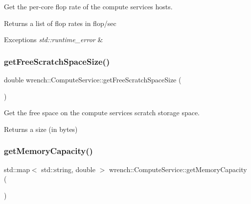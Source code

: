 Get the per-\/core flop rate of the compute service\textquotesingle{}s hosts. 

\begin{DoxyReturn}{Returns}
a list of flop rates in flop/sec
\end{DoxyReturn}

\begin{DoxyExceptions}{Exceptions}
{\em std\+::runtime\+\_\+error} & \\
\hline
\end{DoxyExceptions}
\mbox{\label{classwrench_1_1_compute_service_ac3662628f589ffe44e17921e60971fd6}} 
\subsubsection{\texorpdfstring{get\+Free\+Scratch\+Space\+Size()}{getFreeScratchSpaceSize()}}
{\footnotesize\ttfamily double wrench\+::\+Compute\+Service\+::get\+Free\+Scratch\+Space\+Size (\begin{DoxyParamCaption}{ }\end{DoxyParamCaption})}



Get the free space on the compute service\textquotesingle{}s scratch storage space. 

\begin{DoxyReturn}{Returns}
a size (in bytes) 
\end{DoxyReturn}
\mbox{\label{classwrench_1_1_compute_service_a113d9698fc83cefd78121e279b99b51e}} 
\subsubsection{\texorpdfstring{get\+Memory\+Capacity()}{getMemoryCapacity()}}
{\footnotesize\ttfamily std\+::map$<$ std\+::string, double $>$ wrench\+::\+Compute\+Service\+::get\+Memory\+Capacity (\begin{DoxyParamCaption}{ }\end{DoxyParamCaption})}



